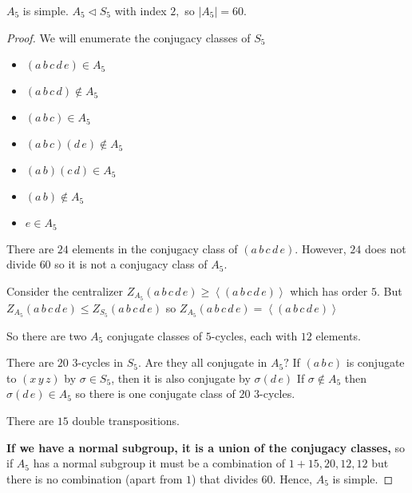\documentclass[a4paper]{article}
\begin{document}
\begin{proposition}
    $A_5$ is simple. $A_5\triangleleft S_5$ with index $2,$ so $|A_5|=60.$
    
    \begin{proof}
        We will enumerate the conjugacy classes of $S_5$ \begin{itemize}
            \item $(a\,b\,c\,d\,e)\in A_5$
            \item $(a\,b\,c\,d)\notin A_5$
            \item $(a\,b\,c)\in A_5$
            \item $(a\,b\,c)(d\,e)\notin A_5$
            \item $(a\,b)(c\,d)\in A_5$
            \item $(a\,b)\notin A_5$
            \item $e\in A_5$
        \end{itemize}
        There are $24$ elements in the conjugacy class of $(a\,b\,c\,d\,e).$ However, $24$ does not divide $60$ so it is not a conjugacy class of $A_5.$

        Consider the centralizer $Z_{A_5}(a\,b\,c\,d\,e)\geq\left\langle(a\,b\,c\,d\,e)\right\rangle$ which has order $5$. But $Z_{A_5}(a\,b\,c\,d\,e)\leq Z_{S_5}(a\,b\,c\,d\,e)$ so $Z_{A_5}(a\,b\,c\,d\,e)=\left\langle(a\,b\,c\,d\,e)\right\rangle$

        So there are two $A_5$ conjugate classes of $5$-cycles, each with $12$ elements.

        There are $20$ $3$-cycles in $S_5.$ Are they all conjugate in $A_5?$ If $(a\,b\,c)$ is conjugate to $(x\,y\,z)$ by $\sigma\in S_5$, then it is also conjugate by $\sigma(d\,e)$ If $\sigma\notin A_5$ then $\sigma(d\,e)\in A_5$ so there is one conjugate class of $20$ $3$-cycles. 

        There are $15$ double transpositions.

        \textbf{If we have a normal subgroup, it is a union of the conjugacy classes,} so if $A_5$ has a normal subgroup it must be a combination of $1+15,20,12,12$ but there is no combination (apart from $1$) that divides $60.$ Hence, $A_5$ is simple. 
    \end{proof}
\end{proposition}
\end{document}
